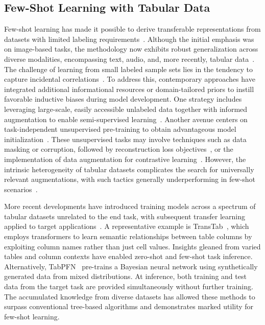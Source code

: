 \subsection{Few-Shot Learning with Tabular Data} Few-shot learning has made it possible to derive transferable representations from datasets with limited labeling requirements~\cite{chen2018closer}. Although the initial emphasis was on image-based tasks, the methodology now exhibits robust generalization across diverse modalities, encompassing text, audio, and, more recently, tabular data~\cite{majumder2022few,nam2023stunt,schick2021exploiting}. The challenge of learning from small labeled sample sets lies in the tendency to capture incidental correlations~\cite{bartlett2021deep}. To address this, contemporary approaches have integrated additional informational resources or domain-tailored priors to instill favorable inductive biases during model development. One strategy includes leveraging large-scale, easily accessible unlabeled data together with informed augmentation to enable semi-supervised learning~\cite{ucar2021subtab,yoon2020vime}. Another avenue centers on task-independent unsupervised pre-training to obtain advantageous model initialization~\cite{somepalli2021saint}. These unsupervised tasks may involve techniques such as data masking or corruption, followed by reconstruction loss objectives~\cite{arik2021tabnet,majmundar2022met}, or the implementation of data augmentation for contrastive learning~\cite{bahri2022scarf,chen2020simple}. However, the intrinsic heterogeneity of tabular datasets complicates the search for universally relevant augmentations, with such tactics generally underperforming in few-shot scenarios~\cite{nam2023stunt}.

More recent developments have introduced training models across a spectrum of tabular datasets unrelated to the end task, with subsequent transfer learning applied to target applications~\cite{zhang2023generative,levin2022transfer,zhu2023xtab}. A representative example is TransTab~\cite{wang2022transtab}, which employs transformers to learn semantic relationships between table columns by exploiting column names rather than just cell values. Insights gleaned from varied tables and column contexts have enabled zero-shot and few-shot task inference. Alternatively, TabPFN~\cite{hollmann2022tabpfn} pre-trains a Bayesian neural network using synthetically generated data from mixed distributions. At inference, both training and test data from the target task are provided simultaneously without further training. The accumulated knowledge from diverse datasets has allowed these methods to surpass conventional tree-based algorithms and demonstrates marked utility for few-shot learning.

